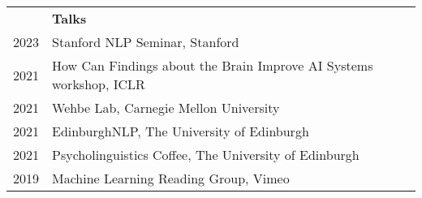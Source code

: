 \documentclass[letterpaper, 11pt]{article}
\newcommand{\headingfont}{\Large\color{Black}}
\newenvironment{SectionTableHalfSpace}[1]{
	\renewcommand*{\arraystretch}{.9}
	\setlength{\tabcolsep}{10pt}
	\begin{longtable}{Rp{5.2in}} & #1 \\[0.3em]}
{\end{longtable}\vspace{-.3cm}}
\begin{document}
\begin{SectionTableHalfSpace}{\headingfont \textbf{Talks}}

   2023 & Stanford NLP Seminar, Stanford
\\

2021 & How Can Findings about the Brain Improve AI Systems workshop, ICLR
 \\
 
 2021 & Wehbe Lab, Carnegie Mellon University
 \\
 
  2021 & EdinburghNLP, The University of Edinburgh
 \\

   2021 & Psycholinguistics Coffee, The University of Edinburgh
\\


2019 & Machine Learning Reading Group, Vimeo
\\


\end{SectionTableHalfSpace}
\end{document}
